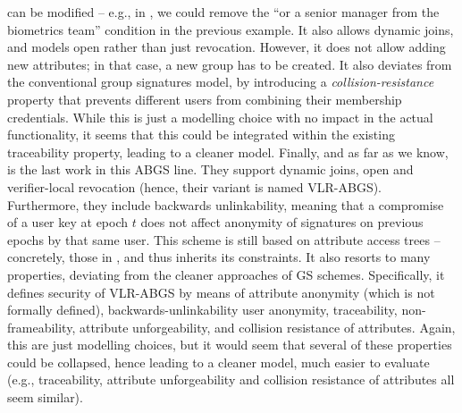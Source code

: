 can be modified -- e.g., in \cite{emo09}, we could remove the ``or a senior
manager from the biometrics team'' condition in the previous example. It also
allows dynamic joins, and models open rather than just revocation. However,
it does not
allow adding new attributes; in that case, a new group has to be created. It
also deviates from the conventional group signatures model, by introducing a
\emph{collision-resistance} property that prevents different users from
combining their membership credentials. While this is just a modelling choice
with no impact in the actual functionality, it seems that this could be
integrated within the existing traceability property, leading to a cleaner
model. 
%
Finally, and as far as we know, \cite{aa14} is the last work in this ABGS line.
They support dynamic joins, open and verifier-local revocation (hence, their
variant is named VLR-ABGS). Furthermore, they include backwards unlinkability,
meaning that a compromise of a user key at epoch $t$ does not affect anonymity
of signatures on previous epochs by that same user. This scheme is still based
on attribute access trees -- concretely, those in \cite{emo09}, and thus
inherits its constraints. It also resorts to many properties, deviating from the
cleaner approaches of GS schemes. Specifically, it defines security of VLR-ABGS
by means of attribute anonymity (which is not formally defined),
backwards-unlinkability user anonymity, traceability, non-frameability,
attribute unforgeability, and collision resistance of attributes. Again, this
are just modelling choices, but it would seem that several of these properties
could be collapsed, hence leading to a cleaner model, much easier to evaluate
(e.g., traceability, attribute unforgeability and collision resistance of
attributes all seem similar).

